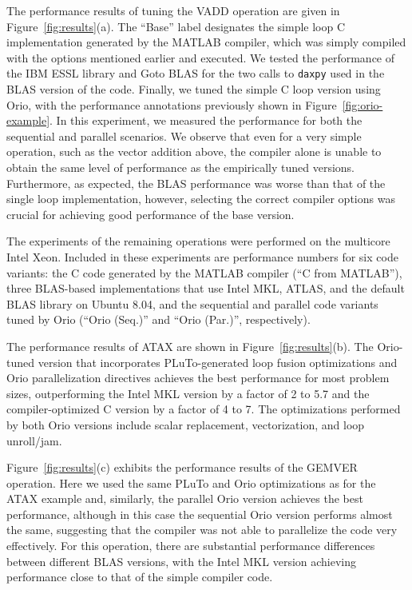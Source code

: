 \documentclass[runningheads]{llncs}
\begin{document}
The performance results of tuning the VADD operation are given in
Figure~\ref{fig:results}(a). The ``Base'' label designates the simple
loop C implementation generated by the MATLAB compiler, which was
simply compiled with the options mentioned earlier and executed. We
tested the performance of the IBM ESSL library and Goto BLAS for the
two calls to \texttt{daxpy} used in the BLAS version of the code.
Finally, we tuned the simple C loop version using Orio, with the
performance annotations previously shown in
Figure~\ref{fig:orio-example}. In this experiment, we measured the
performance for both the sequential and parallel scenarios. We observe
that even for a very simple operation, such as the vector addition
above, the compiler alone is unable to obtain the same level of
performance as the empirically tuned versions. Furthermore, as
expected, the BLAS performance was worse than that of the single loop
implementation, however, selecting the correct compiler options was
crucial for achieving good performance of the base version.

The experiments of the remaining operations were performed on the
multicore Intel Xeon. Included in these experiments are performance
numbers for six code variants: the C code generated by the MATLAB
compiler (``C from MATLAB''), three BLAS-based implementations that
use Intel MKL, ATLAS, and the default BLAS library on Ubuntu 8.04, and
the sequential and parallel code variants tuned by Orio (``Orio
(Seq.)'' and ``Orio (Par.)'', respectively).

The performance results of ATAX are shown in
Figure~\ref{fig:results}(b). The Orio-tuned version that incorporates
PLuTo-generated loop fusion optimizations and Orio parallelization
directives achieves the best performance for most problem sizes,
outperforming the Intel MKL version by a factor of 2 to 5.7 and the
compiler-optimized C version by a factor of 4 to 7. The optimizations
performed by both Orio versions include scalar replacement,
vectorization, and loop unroll/jam.

Figure~\ref{fig:results}(c) exhibits the performance results of the
GEMVER operation. Here we used the same PLuTo and Orio optimizations
as for the ATAX example and, similarly, the parallel Orio version
achieves the best performance, although in this case the sequential
Orio version performs almost the same, suggesting that the compiler was
not able to parallelize the code very effectively. For this operation,
there are substantial performance differences between different BLAS
versions, with the Intel MKL version achieving performance close to
that of the simple compiler code.
\end{document}
